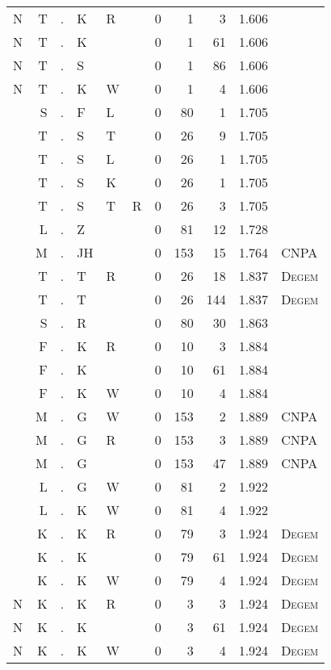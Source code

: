 \begin{longtable}{r@{ } r@{ } c@{ } l@{ } l@{ } l@{ } r r r r l }
N & T & . & K & R &   & 0 & 1 & 3 & 1.606 &  \\
N & T & . & K &   &   & 0 & 1 & 61 & 1.606 &  \\
N & T & . & S &   &   & 0 & 1 & 86 & 1.606 &  \\
N & T & . & K & W &   & 0 & 1 & 4 & 1.606 &  \\
  & S & . & F & L &   & 0 & 80 & 1 & 1.705 &  \\
  & T & . & S & T &   & 0 & 26 & 9 & 1.705 &  \\
  & T & . & S & L &   & 0 & 26 & 1 & 1.705 &  \\
  & T & . & S & K &   & 0 & 26 & 1 & 1.705 &  \\
  & T & . & S & T & R & 0 & 26 & 3 & 1.705 &  \\
  & L & . & Z &   &   & 0 & 81 & 12 & 1.728 &  \\
  & M & . & JH &   &   & 0 & 153 & 15 & 1.764 & \textsc{CNPA} \\
  & T & . & T & R &   & 0 & 26 & 18 & 1.837 & \textsc{Degem} \\
  & T & . & T &   &   & 0 & 26 & 144 & 1.837 & \textsc{Degem} \\
  & S & . & R &   &   & 0 & 80 & 30 & 1.863 &  \\
  & F & . & K & R &   & 0 & 10 & 3 & 1.884 &  \\
  & F & . & K &   &   & 0 & 10 & 61 & 1.884 &  \\
  & F & . & K & W &   & 0 & 10 & 4 & 1.884 &  \\
  & M & . & G & W &   & 0 & 153 & 2 & 1.889 & \textsc{CNPA} \\
  & M & . & G & R &   & 0 & 153 & 3 & 1.889 & \textsc{CNPA} \\
  & M & . & G &   &   & 0 & 153 & 47 & 1.889 & \textsc{CNPA} \\
  & L & . & G & W &   & 0 & 81 & 2 & 1.922 &  \\
  & L & . & K & W &   & 0 & 81 & 4 & 1.922 &  \\
  & K & . & K & R &   & 0 & 79 & 3 & 1.924 & \textsc{Degem} \\
  & K & . & K &   &   & 0 & 79 & 61 & 1.924 & \textsc{Degem} \\
  & K & . & K & W &   & 0 & 79 & 4 & 1.924 & \textsc{Degem} \\
N & K & . & K & R &   & 0 & 3 & 3 & 1.924 & \textsc{Degem} \\
N & K & . & K &   &   & 0 & 3 & 61 & 1.924 & \textsc{Degem} \\
N & K & . & K & W &   & 0 & 3 & 4 & 1.924 & \textsc{Degem} \\

\end{longtable}
